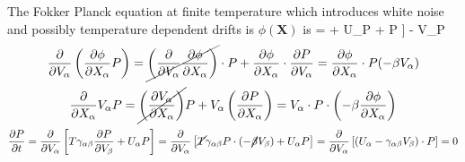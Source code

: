 \documentclass[books,12pt]{elegantpaper}
\begin{document}
The Fokker Planck equation at finite temperature which introduces white noise and possibly temperature dependent drifts is $\phi(\mathbf{X})$ is 
\beq {} =  \left[ T \gamma_{\alpha\beta} \pder[P]{V_\beta} + U_\alpha P +  P \right] -  V_\alpha P   \eeq
{}
$$ \pder{V_\alpha} \left( \pder[\phi]{X_\alpha} P \right) = \cancel{ \left( \pder{V_\alpha} \pder[\phi]{X_\alpha} \right) } \cdot P + \pder[\phi]{X_\alpha} \cdot \pder[P]{V_\alpha} = \pder[\phi]{X_\alpha} \cdot P (-\beta V_\alpha) $$
$$ \pder{X_\alpha} V_\alpha P = \cancel{ \left( \pder[V_\alpha]{X_\alpha} \right) } P + V_\alpha \left( \pder[P]{X_\alpha} \right) = V_\alpha \cdot P \cdot \left( -\beta \pder[\phi]{X_\alpha} \right) $$
$$ \pder[P]{t} = \pder{V_\alpha} \left[ T \gamma_{\alpha\beta} \pder[P]{V_\beta} + U_\alpha P \right] = \pder{V_\alpha} \left[ \cancel{T} \gamma_{\alpha\beta} P \cdot (- \cancel\beta V_\beta) + U_\alpha P \right] = \pder{V_\alpha} \left[ (U_\alpha - \gamma_{\alpha\beta} V_\beta) \cdot P \right] = 0 $$
\end{document}

